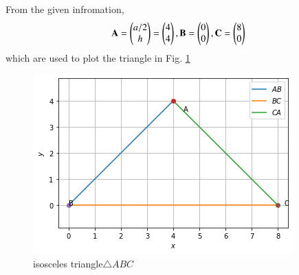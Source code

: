 From the given infromation, 
\begin{align}
\mathbf{A} = \begin{pmatrix}a/2\\h\end{pmatrix} = \begin{pmatrix}4\\4\end{pmatrix}, \mathbf{B} = \begin{pmatrix}0\\0\end{pmatrix}, \mathbf{C} = \begin{pmatrix}8\\0\end{pmatrix}
\end{align}
which are used to plot the triangle in Fig. \ref{tri/2/fig:tri_SSS_triangle}	
%
\begin{figure}[!ht]
\centering
\includegraphics[width=\columnwidth]{solutions/triangle/2/diagram.png}
\caption{isosceles triangle$\triangle ABC$}
\label{tri/2/fig:tri_SSS_triangle}	
\end{figure}


